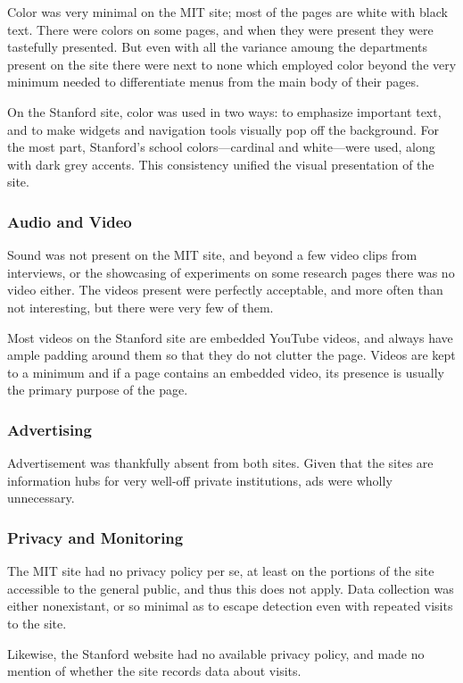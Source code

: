 Color was very minimal on the MIT site; most of the pages are white with black text. There
were colors on some pages, and when they were present they were tastefully presented. But
even with all the variance amoung the departments present on the site there were next to none
which employed color beyond the very minimum needed to differentiate menus from the main
body of their pages.

On the Stanford site, color was used in two ways: to emphasize important text,
and to make widgets and navigation tools visually pop off the background.
For the most part, Stanford's school colors---cardinal and white---were used,
along with dark grey accents. This consistency unified the visual presentation
of the site.

\subsubsection*{Audio and Video}

Sound was not present on the MIT site, and beyond a few video clips from interviews, or the
showcasing of experiments on some research pages there was no video either. The videos
present were perfectly acceptable, and more often than not interesting, but there were very
few of them.

Most videos on the Stanford site are embedded YouTube videos, and always have ample
padding around them so that they do not clutter the page. Videos are kept to a
minimum and if a page contains an embedded video, its presence is usually the
primary purpose of the page.

\subsubsection*{Advertising}

Advertisement was thankfully absent from both sites. Given that the sites are information hubs
for very well-off private institutions, ads were wholly unnecessary.

\subsubsection*{Privacy and Monitoring}

The MIT site had no privacy policy per se, at least on the portions of the site accessible to the
general public, and thus this does not apply. Data collection was either nonexistant, or so
minimal as to escape detection even with repeated visits to the site.

Likewise, the Stanford website had no available privacy policy, and made no mention
of whether the site records data about visits.
